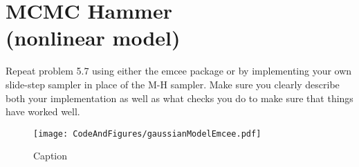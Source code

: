\section{MCMC Hammer \\(nonlinear model)}

Repeat problem 5.7 using either the
emcee package or by implementing your own slide-step sampler in place of the M-H sampler.
Make sure you clearly describe both your implementation as well as what checks you do to make sure that things have worked well.

\begin{figure}
    \centering
    \texttt{[image: CodeAndFigures/gaussianModelEmcee.pdf]}
    \caption{Caption}
    \label{fig:gaussEmcee}
\end{figure}